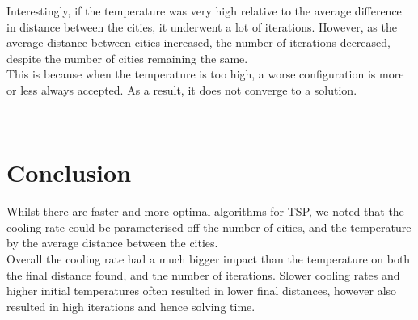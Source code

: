 \documentclass{article}
\begin{document}
Interestingly, if the temperature was very high relative to the average difference in distance between the cities, it underwent a lot of iterations.
However, as the average distance between cities increased, the number of iterations decreased, despite the number of cities remaining the same.
\\

This is because when the temperature is too high, a worse configuration is more or less always accepted.
As a result, it does not converge to a solution.







\\


\newpage
\section{Conclusion}
Whilst there are faster and more optimal algorithms for TSP, we noted that the cooling rate could be parameterised off the number of cities, and the temperature by the average distance between the cities.
\\

Overall the cooling rate had a much bigger impact than the temperature on both the final distance found, and the number of iterations.
Slower cooling rates and higher initial temperatures often resulted in lower final distances, however also resulted in high iterations and hence solving time.
\\
\end{document}
